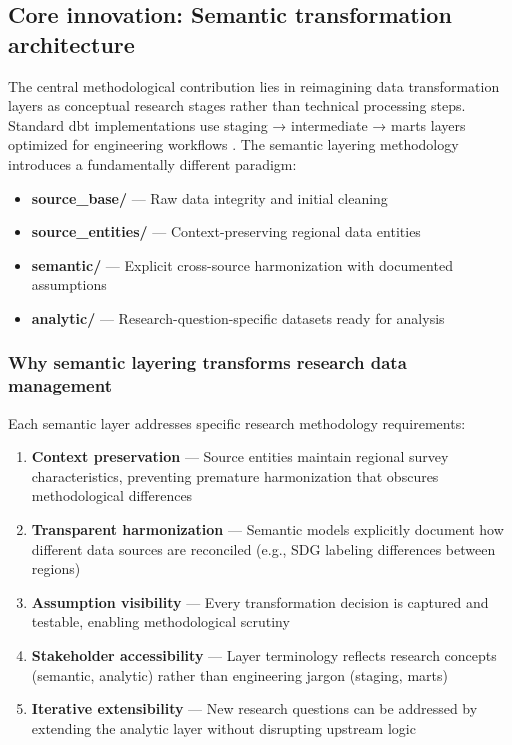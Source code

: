 \documentclass{article}
\begin{document}
\subsection{Core innovation: Semantic transformation architecture}
\label{subsec:core-innovation}

The central methodological contribution lies in reimagining data transformation layers as conceptual research stages rather than technical processing steps. Standard dbt implementations use staging → intermediate → marts layers optimized for engineering workflows \cite{dbt_docs_structure}. The semantic layering methodology introduces a fundamentally different paradigm:

\begin{itemize}
    \item \textbf{source\_base/} — Raw data integrity and initial cleaning
    \item \textbf{source\_entities/} — Context-preserving regional data entities
    \item \textbf{semantic/} — Explicit cross-source harmonization with documented assumptions
    \item \textbf{analytic/} — Research-question-specific datasets ready for analysis
\end{itemize}

\subsubsection{Why semantic layering transforms research data management}
\label{subsubsec:semantic-benefits}

Each semantic layer addresses specific research methodology requirements:

\begin{enumerate}
    \item \textbf{Context preservation} — Source entities maintain regional survey characteristics, preventing premature harmonization that obscures methodological differences
    \item \textbf{Transparent harmonization} — Semantic models explicitly document how different data sources are reconciled (e.g., SDG labeling differences between regions)
    \item \textbf{Assumption visibility} — Every transformation decision is captured and testable, enabling methodological scrutiny
    \item \textbf{Stakeholder accessibility} — Layer terminology reflects research concepts (semantic, analytic) rather than engineering jargon (staging, marts)
    \item \textbf{Iterative extensibility} — New research questions can be addressed by extending the analytic layer without disrupting upstream logic
\end{enumerate}
\end{document}
